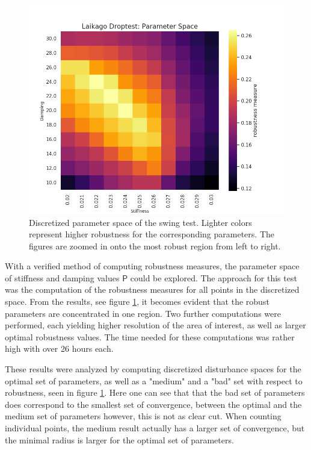 \begin{figure}[h]
\begin{minipage}{0.33\textwidth}
        \end{minipage}
        \begin{minipage}{0.33\textwidth}
            \centering
            \includegraphics[width=\textwidth]{figures/droptest_ps_zoom2_correct.png} %
        \end{minipage}

    \caption[Discretized Parameter Space, Drop Test]{Discretized parameter space of the swing test. Lighter colors represent higher robustness for the corresponding parameters. The figures are zoomed in onto the most robust region from left to right.}
    \label{fig:dropps}
    \end{figure}

    With a verified method of computing robustness measures, the parameter space of stiffness and damping values $\mathsf{P}$ could be explored. The approach for this test was the computation of the robustness measures for all points in the  discretized space. From the results, see figure \ref{fig:dropps}, it becomes evident that the robust parameters are concentrated in one region. Two further computations were performed, each yielding higher resolution of the area of interest, as well as larger optimal robustness values. The time needed for these computations was rather high with over 26 hours each. 

    These results were analyzed by computing discretized disturbance spaces for the optimal set of parameters, as well as a "medium" and a "bad" set with respect to robustness, seen in figure \ref{fig:dropps}. Here one can see that that the bad set of parameters does correspond to the smallest set of convergence, between the optimal and the medium set of parameters however, this is not as clear cut. When counting individual points, the medium result actually has a larger set of convergence, but the minimal radius is larger for the optimal set of parameters.

